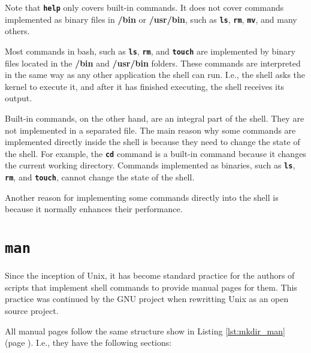 Note that \textbf{\texttt{help}} only covers built-in commands. It does not cover commands implemented as binary files in \textbf{/bin} or \textbf{/usr/bin}, such as \textbf{\texttt{ls}}, \textbf{\texttt{rm}}, \textbf{\texttt{mv}}, and many others.


\begin{my_box}
  Most commands in bash, such as \textbf{\texttt{ls}}, \textbf{\texttt{rm}}, and \textbf{\texttt{touch}} are implemented by binary files located in the \textbf{/bin} and \textbf{/usr/bin} folders. These commands are interpreted in the same way as any other application the shell can run. I.e., the shell asks the kernel to execute it, and after it has finished executing, the shell receives its output.

  Built-in commands, on the other hand, are an integral part of the shell. They are not implemented in a separated file. The main reason why some commands are implemented directly inside the shell is because they need to change the state of the shell. For example, the \textbf{\texttt{cd}} command is a built-in command because it changes the current working directory. Commands implemented as binaries, such as \textbf{\texttt{ls}}, \textbf{\texttt{rm}}, and \textbf{\texttt{touch}}, cannot change the state of the shell.

  Another reason for implementing some commands directly into the shell is because it normally enhances their performance.
\end{my_box}

\section{\textbf{\texttt{man}}}

Since the inception of Unix, it has become standard practice for the authors of scripts that implement shell commands to provide manual pages for them. This practice was continued by the GNU project when rewritting Unix as an open source project.

All manual pages follow the same structure show in Listing \ref{lst:mkdir_man} (page \pageref{lst:mkdir_man}). I.e., they have the following sections:

